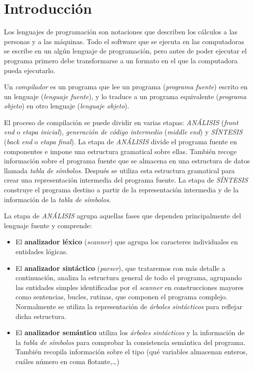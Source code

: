 
\section{Introducción}

Los lenguajes de programación son notaciones que describen los cálculos a las personas y a las máquinas. Todo el software que se ejecuta en las computadoras se escribe en un algún lenguaje de programación,  pero antes de poder ejecutar el programa primero debe transformarse a un formato en el que la computadora pueda ejecutarlo.  

Un \textit{compilador} es un programa que lee  un programa  (\textit{programa fuente}) escrito en un lenguaje (\textit{lenguaje fuente}), y lo traduce a un programa equivalente (\textit{programa objeto})  en otro lenguaje (\textit{lenguaje objeto}).

El proceso de compilación se puede dividir en varias etapas: \textit{ANÁLISIS} (\textit{front end} o \textit{etapa inicial}), \textit{generación de código intermedio} (\textit{middle end})  y \textit{SÍNTESIS} (\textit{back end} o \textit{etapa final}).  La etapa de \textit{ANÁLISIS} divide el programa fuente en componentes e impone una estructura gramatical sobre ellas. También recoge información sobre el programa fuente que se almacena en una estructura de datos llamada \textit{tabla de símbolos}. Después se utiliza esta estructura gramatical para crear una representación intermedia del programa fuente. La etapa de \textit{SÍNTESIS}  construye el programa destino a partir de la representación intermedia y de la información de la \textit{tabla de símbolos}.



La etapa de \textit{ANÁLISIS} agrupa aquellas fases que dependen principalmente del lenguaje fuente y comprende:

\begin{itemize}
	\item El \textbf{analizador léxico} (\textit{scanner}) que agrupa los caracteres individuales en entidades lógicas.
	\item El \textbf{analizador sintáctico} (\textit{parser}), que trataremos con más detalle a continuación, analiza la estructura general de todo el programa, agrupando las entidades simples identificadas por el \textit{scanner} en construcciones mayores como sentencias, bucles, rutinas, que componen el programa complejo. Normalmente se utiliza la representación de \textit{árboles sintácticos} para reflejar dicha estructura.
	\item El \textbf{analizador semántico} utiliza los \textit{árboles sintácticos} y la información de la \textit{tabla de símbolos} para comprobar la consistencia semántica del programa. También recopila información sobre el tipo (qué variables almacenan enteros, cuáles número en coma flotante,…)
	
\end{itemize}

